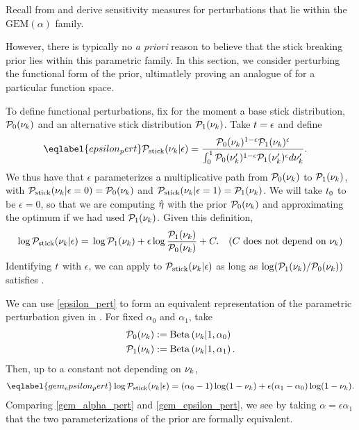 Recall from  and  derive
sensitivity measures for perturbations that lie within the
$\mathrm{GEM}(\alpha)$ family.

However, there is typically no {\em a priori}
reason to believe that the stick breaking prior lies within this parametric
family.  In this section, we consider perturbing the functional form of the
prior, ultimatlely proving an analogue of  for a particular
function space.

To define functional perturbations, fix for the moment a base stick
distribution, $\mathcal{P}_{0}(\nu_{k})$ and an alternative stick distribution $\mathcal{P}_{1}(\nu_{k})$.
Take $t = \epsilon$ and define
%
\begin{align}\eqlabel{epsilon_pert}
%
\pstick(\nuk \vert \epsilon) ={}&
\frac{\pbase(\nuk)^{1 - \epsilon} \palt(\nuk)^\epsilon}
     {\int_0^1 \pbase(\nuk')^{1 - \epsilon} \palt(\nuk')^\epsilon d\nuk'}.
%
\end{align}
%
We thus have that $\epsilon$ parameterizes a multiplicative path from
$\mathcal{P}_{0}(\nu_{k})$ to $\mathcal{P}_{1}(\nu_{k})$, with $\mathcal{P}_{\mathrm{stick}}(\nu_{k} \vert \epsilon = 0) = \mathcal{P}_{0}(\nu_{k})$
and $\mathcal{P}_{\mathrm{stick}}(\nu_{k} \vert \epsilon=1) = \mathcal{P}_{1}(\nu_{k})$.  We will take
$t_0$ to be $\epsilon = 0$, so that we are computing $\hat\eta$ with the
prior $\mathcal{P}_{0}(\nu_{k})$ and approximating the optimum if we had used $\mathcal{P}_{1}(\nu_{k})$.
%
Given this definition,
%
\begin{align*}
%
\log \pstick(\nuk \vert \epsilon) ={}&
    \log \palt(\nuk) + \epsilon \log \frac{\palt(\nuk)}{\pbase(\nuk)} + \const.
    & \constdesc{\nuk}
%
\end{align*}
%
Identifying $t$ with $\epsilon$, we can apply  to
$\mathcal{P}_{\mathrm{stick}}(\nu_{k} \vert \epsilon)$ as long as $\log (\mathcal{P}_{1}(\nu_{k}) / \mathcal{P}_{0}(\nu_{k}))$
satisfies .

\begin{ex}
%
We can use \eqref{epsilon_pert} to form an equivalent representation of the
parametric perturbation given in .  For fixed
$\alpha_0$ and $\alpha_1$, take
%
\begin{align*}
%
\pbase(\nuk) :={}& \betadist{\nuk \vert 1, \alpha_0}\\
\palt(\nuk) :={}& \betadist{\nuk \vert 1, \alpha_1}.
%
\end{align*}
%
Then, up to a constant not depending on $\nu_{k}$,
%
\begin{align}\eqlabel{gem_epsilon_pert}
%
\log \pstick(\nuk \vert \epsilon) =
    (\alpha_0 - 1) \log(1 - \nuk) +
    \epsilon  (\alpha_1 - \alpha_0) \log(1 - \nuk).
%
\end{align}
%
Comparing \eqref{gem_alpha_pert} and \eqref{gem_epsilon_pert}, we see by taking
$\alpha = \epsilon \alpha_1$ that the two parameterizations of the prior are
formally equivalent.
%
\end{ex}

